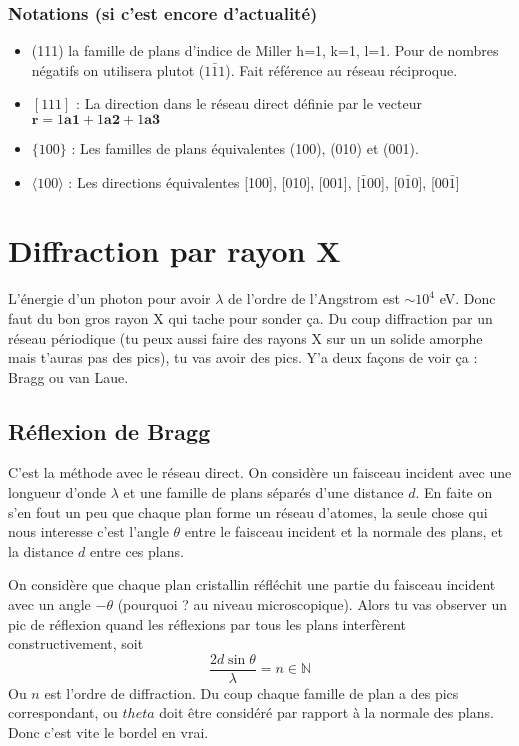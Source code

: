 \documentclass[a4paper]{report}
\begin{document}
  \subsection{Notations (si c'est encore d'actualité)}
  \begin{itemize}
  \item (111) la famille de plans d'indice de Miller h=1, k=1, l=1. Pour de nombres négatifs on utilisera plutot ($1\bar 1 1$). Fait référence au réseau réciproque.
  \item $[111]$ : La direction dans le réseau direct définie par le vecteur $\mathbf{r} = 1 \mathbf{a1} + 1 \mathbf{a2} + 1 \mathbf{a3} $
  \item $\{ 100 \}$ : Les familles de plans équivalentes (100), (010) et (001).
  \item $\langle 100 \rangle$ : Les directions équivalentes [100], [010], [001], [$\bar 1 00$], [$0\bar 1 0$], [$00\bar 1$]
  \end{itemize}
  \chapter{Diffraction par rayon X}
  L'énergie d'un photon pour avoir $\lambda$ de l'ordre de l'Angstrom est $\sim 10^4$ eV. Donc faut du bon gros rayon X qui tache pour sonder ça. Du coup diffraction par un réseau périodique (tu peux aussi faire des rayons X sur un un solide amorphe mais t'auras pas des pics), tu vas avoir des pics. Y'a deux façons de voir ça : Bragg ou van Laue.
  \section{Réflexion de Bragg}
  C'est la méthode avec le réseau direct. On considère un faisceau incident avec une longueur d'onde $\lambda$ et une famille de plans séparés d'une distance $d$. En faite on s'en fout un peu que chaque plan forme un réseau d'atomes, la seule chose qui nous interesse c'est l'angle $\theta$ entre le faisceau incident et la normale des plans, et la distance $d$ entre ces plans.
  
  On considère que chaque plan cristallin réfléchit une partie du faisceau incident avec un angle $-\theta$ (pourquoi ? au niveau microscopique). Alors tu vas observer un pic de réflexion quand les réflexions par tous les plans interfèrent constructivement, soit $$\frac{2d \sin \theta}{\lambda} = n \in \mathbb{N}$$Ou $n$ est l'ordre de diffraction. Du coup chaque famille de plan a des pics correspondant, ou $theta$ doit être considéré par rapport à la normale des plans. Donc c'est vite le bordel en vrai.
\end{document}
